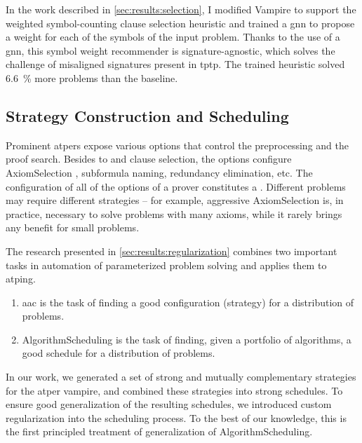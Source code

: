 In the work described in \cref{sec:results:selection},
I modified Vampire to support the weighted symbol-counting clause selection heuristic
and trained a \gls{gnn} to propose a weight for each of the symbols of the input problem.
Thanks to the use of a \gls{gnn}, this symbol weight recommender is signature-agnostic,
which solves the challenge of misaligned signatures present in \gls{tptp}.
The trained heuristic solved \SI{6.6}{\percent} more problems than the baseline.


\subsection{Strategy Construction and Scheduling}

Prominent \glspl{atper} expose various options that control the preprocessing and the proof search.
Besides \gls{to} and clause selection,
the options configure \gls{AxiomSelection} \cite{DBLP:conf/cade/HoderV11}, subformula naming, redundancy elimination, etc.
The configuration of all of the options of a prover constitutes a .
Different problems may require different strategies -- for example, aggressive \gls{AxiomSelection} is, in practice, necessary to solve problems with many axioms, while it rarely brings any benefit for small problems.

The research presented in \cref{sec:results:regularization} combines two important tasks in automation of parameterized problem solving and applies them to \gls{atping}.
\begin{enumerate}
\item \Gls{aac} is the task of finding a good configuration (strategy) for a distribution of problems.
\item \Gls{AlgorithmScheduling} is the task of finding, given a portfolio of algorithms, a good schedule for a distribution of problems.
\end{enumerate}
In our work, we generated a set of strong and mutually complementary strategies for the \gls{atper} \gls{vampire},
and combined these strategies into strong schedules.
To ensure good generalization of the resulting schedules, we introduced custom regularization into the scheduling process.
To the best of our knowledge, this is the first principled treatment of generalization of \gls{AlgorithmScheduling}.

